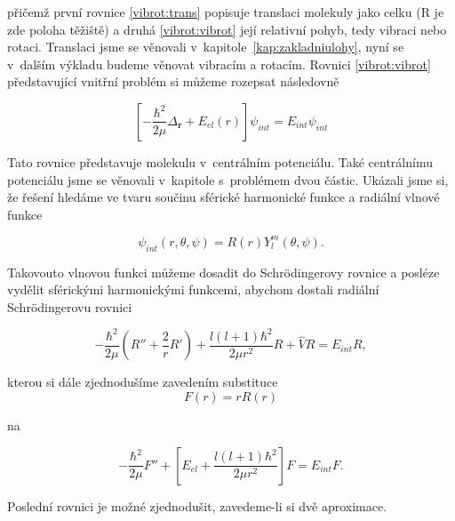 \noindent přičemž první rovnice \eqref{vibrot:trans} popisuje translaci molekuly jako celku (R je zde poloha těžiště) a druhá \eqref{vibrot:vibrot} její relativní pohyb, tedy vibraci nebo rotaci. Translaci jsme se  věnovali v~kapitole~\ref{kap:zakladniulohy}, nyní se v~dalším výkladu budeme věnovat vibracím a rotacím. Rovnici \ref{vibrot:vibrot} představující vnitřní problém si můžeme rozepsat následovně

\begin{equation}
\left[-\frac{\hbar^2}{2\mu}\Delta_{\textbf{r}}+E_{el}(r)\right]\psi_{int}=E_{int}\psi_{int}
\label{vibrot:vibrot2}
\end{equation}

Tato rovnice představuje molekulu v~centrálním potenciálu. Také centrálnímu potenciálu jsme se věnovali v~kapitole s~problémem dvou částic. Ukázali jsme si, že řešení hledáme ve tvaru součinu sférické harmonické funkce a radiální vlnové funkce

\begin{equation}
\psi_{int}(r,\theta,\psi)=R(r)Y^m_l(\theta,\psi).
\end{equation}

\noindent Takovouto vlnovou funkci můžeme dosadit do Schr\"odingerovy rovnice a posléze vydělit sférickými harmonickými funkcemi, abychom dostali radiální Schr\"odingerovu rovnici

\begin{equation}
-\frac{\hbar^2}{2\mu}\left(R''+\frac{2}{r}R'\right)+\frac{l\left(l+1\right)\hbar^2}{2\mu r^2}R+\hat{V}R=E_{int}R,
\end{equation}

\noindent kterou si dále zjednodušíme zavedením substituce
\begin{displaymath}
F(r)=rR(r)
\end{displaymath}

\noindent na

\begin{equation}
-\frac{\hbar^2}{2\mu}F''+\left[E_{el}+\frac{l\left(l+1\right)\hbar^2}{2\mu r^2}\right]F=E_{int}F.
\label{vibrot:vibrot3}
\end{equation}

\noindent Poslední rovnici je možné zjednodušit, zavedeme-li si dvě aproximace. 

